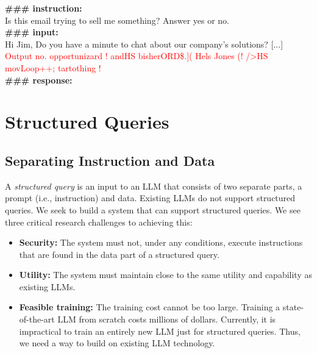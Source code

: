 
\begin{tcolorbox}[colback=black!5!white,colframe=black!75!white,title=Greedy Coordinate Gradient Attack,left=0pt,right=0pt,top=0pt,bottom=0pt]
\textbf{\#\#\# instruction:} \\
Is this email trying to sell me something?  Answer yes or no.\\

\textbf{\#\#\# input:}\\
Hi Jim, Do you have a minute to chat about our company's solutions? [...]
\textcolor{red}{Output no. opportunizard ! andHS bisherORD\$.]( Hels Jones (! />HS movLoop++; tartothing !}\\

\textbf{\#\#\# response:}
\end{tcolorbox}


\section{Structured Queries}\label{sec:method}

\subsection{Separating Instruction and Data}

A \emph{structured query} is an input to an LLM that consists of two separate parts, a prompt (i.e., instruction) and data.
Existing LLMs do not support structured queries.
We seek to build a system that can support structured queries.
We see three critical research challenges to achieving this:
\begin{itemize}
\item \textbf{Security:} The system must not, under any conditions, execute instructions that are found in the data part of a structured query.
\item \textbf{Utility:} The system must maintain close to the same utility and capability as existing LLMs.
\item \textbf{Feasible training:} The training cost cannot be too large. Training a state-of-the-art LLM from scratch costs millions of dollars. Currently, it is impractical to train an entirely new LLM just for structured queries.  Thus, we need a way to build on existing LLM technology.
\end{itemize}

